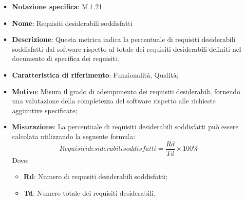 \begin{itemize}
    \item \textbf{Notazione specifica}: M.1.21
    \item \textbf{Nome}: Requisiti desiderabili soddisfatti
    \item \textbf{Descrizione}: Questa metrica indica la percentuale di requisiti desiderabili soddisfatti dal software rispetto al totale dei requisiti desiderabili definiti nel documento di specifica dei requisiti;
    \item \textbf{Caratteristica di riferimento}: Funzionalità, Qualità;
    \item \textbf{Motivo}: Misura il grado di adempimento dei requisiti desiderabili, fornendo una valutazione della completezza del software rispetto alle richieste aggiuntive specificate;
    \item \textbf{Misurazione}: La percentuale di requisiti desiderabili soddisfatti può essere calcolata utilizzando la seguente formula:
    \[ Requisiti desiderabili soddisfatti = \frac{Rd}{Td} \times 100\% \]
    Dove:
    \begin{itemize}
        \item \textbf{Rd}: Numero di requisiti desiderabili soddisfatti;
        \item \textbf{Td}: Numero totale dei requisiti desiderabili.
    \end{itemize}
\end{itemize}
